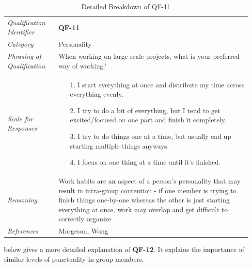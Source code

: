 \documentclass[12pt,letterpaper]{article}
\begin{document}
\begin{table}[H]
	\caption{Detailed Breakdown of QF-11}
	\begin{tabu} to 
		\toprule
		Qualification Identifier & {\bf QF-11}\\
		Category & Personality \\
		Phrasing of Qualification & When working on large scale projects, what is your preferred way of working? \\
		Scale for Responses &
		\begin{minipage}[t]{\linewidth}
			\begin{enumerate}
				\item[1.] I start everything at once and distribute my time across everything evenly.
				\item[2.] I try to do a bit of everything, but I tend to get excited/focused on one part and finish it completely.
				\item[3.] I try to do things one at a time, but usually end up starting multiple things anyways.
				\item[4.] I focus on one thing at a time until it's finished.
			\end{enumerate}
		\end{minipage}\\
		Reasoning & Work habits are an aspect of a person's personality that may result in intra-group contention - if one member is trying to finish things one-by-one whereas the other is just starting everything at once, work may overlap and get difficult to correctly organize.\\
		References & Morgeson\cite{morgeson}, Wong\cite{wong}\\
		\toprule
	\end{tabu}
\end{table}

 below gives a more detailed explanation of {\bf QF-12}. It explains the importance of similar levels of punctuality in group members.
\end{document}
